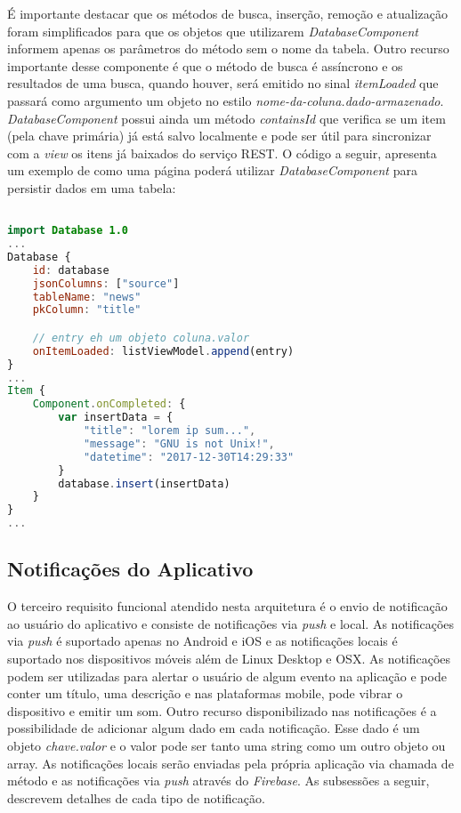 É importante destacar que os métodos de busca, inserção, remoção e atualização foram simplificados para que os objetos que utilizarem \textit{DatabaseComponent} informem apenas os parâmetros do método sem o nome da tabela. Outro recurso importante desse componente é que o método de busca é assíncrono e os resultados de uma busca, quando houver, será emitido no sinal \textit{itemLoaded} que passará como argumento um objeto no estilo \textit{nome-da-coluna.dado-armazenado}. \textit{DatabaseComponent} possui ainda um método \textit{containsId} que verifica se um item (pela chave primária) já está salvo localmente e pode ser útil para sincronizar com a \textit{view} os itens já baixados do serviço REST. O código a seguir, apresenta um exemplo de como uma página poderá utilizar \textit{DatabaseComponent} para persistir dados em uma tabela:

\begin{center}
\begin{lstlisting}[language=qml]

import Database 1.0
...
Database {
	id: database
	jsonColumns: ["source"]
	tableName: "news"
	pkColumn: "title"

	// entry eh um objeto coluna.valor
	onItemLoaded: listViewModel.append(entry)
}
...
Item {
	Component.onCompleted: {
		var insertData = {
			"title": "lorem ip sum...",
			"message": "GNU is not Unix!",
			"datetime": "2017-12-30T14:29:33"
		}
		database.insert(insertData)
	}
}
...
\end{lstlisting}
\end{center}


\subsection{Notificações do Aplicativo}
O terceiro requisito funcional atendido nesta arquitetura é o envio de notificação ao usuário do aplicativo e consiste de notificações via \textit{push} e local. As notificações via \textit{push} é suportado apenas no Android e iOS e as notificações locais é suportado nos dispositivos móveis além de Linux Desktop e OSX. As notificações podem ser utilizadas para alertar o usuário de algum evento na aplicação e pode conter um título, uma descrição e nas plataformas mobile, pode vibrar o dispositivo e emitir um som. Outro recurso disponibilizado nas notificações é a possibilidade de adicionar algum dado em cada notificação. Esse dado é um objeto \textit{chave.valor} e o valor pode ser tanto uma string como um outro objeto ou array. As notificações locais serão enviadas pela própria aplicação via chamada de método e as notificações via \textit{push} através do \textit{Firebase}. As subsessões a seguir, descrevem detalhes de cada tipo de notificação.

